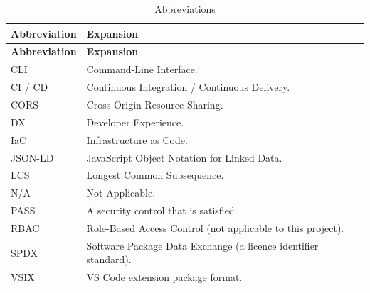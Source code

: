 \begin{longtable}{@{}L{2.6cm}L{11.6cm}@{}}
\caption{Abbreviations}\\
\toprule
\textbf{Abbreviation} & \textbf{Expansion} \\
\midrule
\endfirsthead
\toprule
\textbf{Abbreviation} & \textbf{Expansion} \\
\midrule
\endhead
CLI & Command-Line Interface. \\
CI / CD & Continuous Integration / Continuous Delivery. \\
CORS & Cross-Origin Resource Sharing. \\
DX & Developer Experience. \\
IaC & Infrastructure as Code. \\
JSON-LD & JavaScript Object Notation for Linked Data. \\
LCS & Longest Common Subsequence. \\
N/A & Not Applicable. \\
PASS & A security control that is satisfied. \\
RBAC & Role-Based Access Control (not applicable to this project). \\
SPDX & Software Package Data Exchange (a licence identifier standard). \\
VSIX & VS Code extension package format. \\
\bottomrule
\end{longtable}
